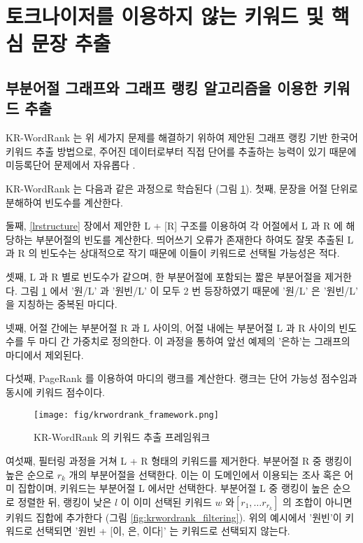 \documentclass[oneside, ko,phd]{snuthesis_utf8_kor}
\begin{document}
\section{토크나이저를 이용하지 않는 키워드 및 핵심 문장 추출}

\subsection{부분어절 그래프와 그래프 랭킹 알고리즘을 이용한 키워드 추출}

KR-WordRank 는 위 세가지 문제를 해결하기 위하여 제안된 그래프 랭킹 기반 한국어 키워드 추출 방법으로, 주어진 데이터로부터 직접 단어를 추출하는 능력이 있기 때문에 미등록단어 문제에서 자유롭다 \cite{kim2014kr}.

KR-WordRank 는 다음과 같은 과정으로 학습된다 (그림 \ref{fig:krwordrank_framework}).
첫째, 문장을 어절 단위로 분해하여 빈도수를 계산한다.

둘째, \ref{lrstructure} 장에서 제안한 L + [R] 구조를 이용하여 각 어절에서 L 과 R 에 해당하는 부분어절의 빈도를 계산한다.
띄어쓰기 오류가 존재한다 하여도 잘못 추출된 L 과 R 의 빈도수는 상대적으로 작기 때문에 이들이 키워드로 선택될 가능성은 적다.

셋째, L 과 R 별로 빈도수가 같으며, 한 부분어절에 포함되는 짧은 부분어절을 제거한다.
그림 \ref{fig:krwordrank_framework} 에서 '원/L' 과 '원빈/L' 이 모두 2 번 등장하였기 때문에 '원/L' 은 '원빈/L' 을 지칭하는 중복된 마디다.

넷째, 어절 간에는 부분어절 R 과 L 사이의, 어절 내에는 부분어절 L 과 R 사이의 빈도수를 두 마디 간 가중치로 정의한다.
이 과정을 통하여 앞선 예제의 '은하'는 그래프의 마디에서 제외된다.

다섯째, PageRank 를 이용하여 마디의 랭크를 계산한다.
랭크는 단어 가능성 점수임과 동시에 키워드 점수이다.

\begin{figure}[H]
\centering
\texttt{[image: fig/krwordrank\_framework.png]}
\caption{KR-WordRank 의 키워드 추출 프레임워크}
\label{fig:krwordrank_framework}
\end{figure}

여섯째, 필터링 과정을 거쳐 L + R 형태의 키워드를 제거한다.
부분어절 R 중 랭킹이 높은 순으로 $r_k$ 개의 부분어절을 선택한다.
이는 이 도메인에서 이용되는 조사 혹은 어미 집합이며, 키워드는 부분어절 L 에서만 선택한다.
부분어절 L 중 랭킹이 높은 순으로 정렬한 뒤, 랭킹이 낮은 $l$ 이 이미 선택된 키워드 $w$ 와$[r_1, \dots r_{r_k}]$ 의 조합이 아니면 키워드 집합에 추가한다 (그림 \ref{fig:krwordrank_filtering}).
위의 예시에서 '원빈'이 키워드로 선택되면 '원빈 + [이, 은, 이다]' 는 키워드로 선택되지 않는다.
\end{document}
